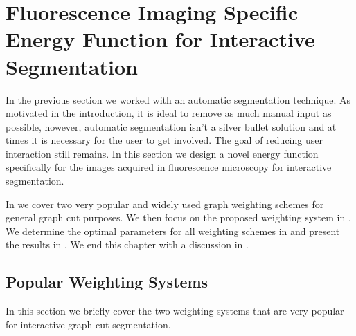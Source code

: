 
\chapter{Fluorescence Imaging Specific Energy Function for Interactive Segmentation} %

\label{chap:Chapter6} %


In the previous section we worked with an automatic segmentation technique. As motivated in the introduction, it is ideal to remove as much manual input as possible, however, automatic segmentation isn't a silver bullet solution and at times it is necessary for the user to get involved. The goal of reducing user interaction still remains. In this section we design a novel energy function specifically for the images acquired in fluorescence microscopy for interactive segmentation.

In  we cover two very popular and widely used graph weighting schemes for general graph cut purposes. We then focus on the proposed weighting system in . We determine the optimal parameters for all weighting schemes in  and present the results in . We end this chapter with a discussion in .


\section{Popular Weighting Systems}
\label{sec:interactivepopularweighting}

In this section we briefly cover the two weighting systems that are very popular for interactive graph cut segmentation.

